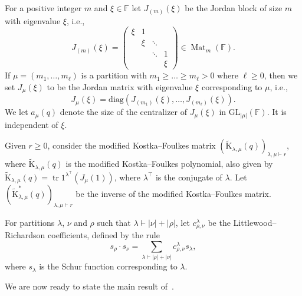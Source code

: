 \documentclass[12pt, reqno]{amsart}
\theoremstyle{definition}
\newcommand{\sizeof}[1]{\left|#1\right|}
\newcommand{\diag}{\mathrm{diag}}
\newcommand{\trace}{\operatorname{tr}}
\newcommand{\GL}{\mathrm{GL}}
\newcommand{\finiteField}{\mathbb{F}}
\newcommand{\squareMatrix}{\operatorname{Mat}}
\newcommand{\kostkaFoulkes}{\mathrm{K}}
\newcommand{\coinvKostkaFoulkes}{\tilde{\mathrm{K}}^{\ast}}
\begin{document}
	For a positive integer $m$ and $\xi \in \finiteField$ let $J_{(m)}\left(\xi\right)$ be the Jordan block of size $m$ with eigenvalue $\xi$, i.e.,
	\begin{displaymath}
	J_{(m)}\left(\xi\right) = \begin{pmatrix}
		\xi & 1\\
		& \xi & \ddots\\
		& & \ddots & 1\\
		& & & \xi
	\end{pmatrix} \in \squareMatrix_m\left(\finiteField\right).
	\end{displaymath}
	If $\mu = \left(m_1,\dots, m_{\ell}\right)$ is a partition with $m_1 \ge \dots \ge m_{\ell} > 0$ where $\ell \ge 0$, then we set $J_{\mu}\left(\xi\right)$ to be the Jordan matrix with eigenvalue $\xi$ corresponding to $\mu$, i.e.,
	\begin{displaymath}
	 J_{\mu}\left(\xi\right) = \diag\left(J_{(m_1)}\left(\xi\right),\dots,J_{(m_{\ell})}\left(\xi\right)\right).
	\end{displaymath}
	We let $a_{\mu}\left(q\right)$ denote the size of the centralizer of $J_{\mu}\left(\xi\right)$ in $\GL_{\sizeof{\mu}}\left(\finiteField\right)$. It is independent of $\xi$.
	
	Given $r \ge 0$, consider the modified Kostka--Foulkes matrix $\left(\tilde{\kostkaFoulkes}_{\lambda,\mu}\left(q\right)\right)_{\lambda,\mu \vdash r}$, where $\tilde{\kostkaFoulkes}_{\lambda,\mu}\left(q\right)$ is the modified Kostka--Foulkes polynomial, also given by $\tilde{\kostkaFoulkes}_{\lambda,\mu}\left(q\right) = \trace 1^{\lambda^{\top}}\left(J_{\mu}\left(1\right)\right)$, where $\lambda^{\top}$ is the conjugate of $\lambda$. Let $\left(\coinvKostkaFoulkes_{\lambda, \mu}\left(q\right)\right)_{\lambda, \mu \vdash r}$ be the inverse of the modified Kostka--Foulkes matrix.
	
	For partitions $\lambda$, $\nu$ and $\rho$ such that $\lambda \vdash \sizeof{\nu} + \sizeof{\rho}$, let $c_{\rho, \nu}^{\lambda}$ be the Littlewood--Richardson coefficients, defined by the rule
	\begin{displaymath}
	s_{\rho} \cdot s_{\nu} = \sum_{\lambda \vdash \sizeof{\rho} + \sizeof{\nu}} c_{\rho, \nu}^{\lambda} s_{\lambda},
	\end{displaymath}
	where $s_{\lambda}$ is the Schur function corresponding to $\lambda$.
	
	We are now ready to state the main result of~\cite{GorodetskyZelingher2026}.
	
\end{document}
